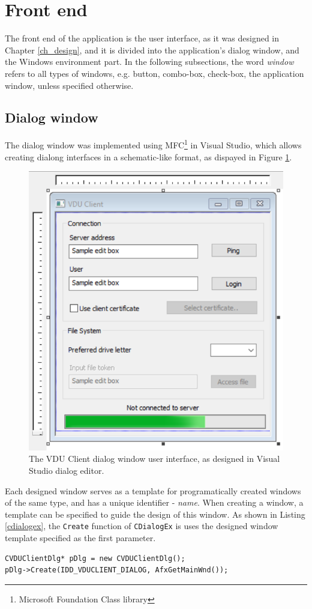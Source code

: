 \section{Front end}
The front end of the application is the user interface, as it was designed in Chapter \ref{ch_design}, and it is divided into the application's dialog window, and the Windows environment part. In the following subsections, the word \textit{window} refers to all types of windows, e.g. button, combo-box, check-box, the application window, unless specified otherwise.

\subsection{Dialog window}
The dialog window was implemented using MFC\footnote{Microsoft Foundation Class library} in Visual Studio, which allows creating dialong interfaces in a schematic-like format, as dispayed in Figure \ref{dialogeditorui}.
\begin{figure}[htb]
    \centering
	\includegraphics[]{obrazky-figures/resourceeditorui.pdf}
	\caption{The VDU Client dialog window user interface, as designed in Visual Studio dialog editor.}
	\label{dialogeditorui}
\end{figure}
Each designed window serves as a template for programatically created windows of the same type, and has a unique identifier - \textit{name}. When creating a window, a template can be specified to guide the design of this window. As shown in Listing \ref{cdialogex}, the \lstinline{Create} function of \lstinline{CDialogEx} is uses the designed window template specified as the first parameter.
\begin{lstlisting}[caption={Creating the extended dialog window of VDU Client}, label=cdialogex]
CVDUClientDlg* pDlg = new CVDUClientDlg();
pDlg->Create(IDD_VDUCLIENT_DIALOG, AfxGetMainWnd());
\end{lstlisting}
